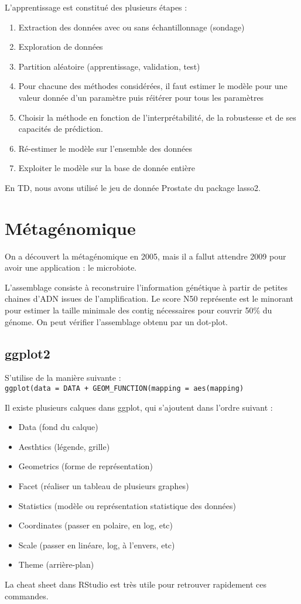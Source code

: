 \documentclass{article}
\begin{document}
L'apprentissage est constitué des plusieurs étapes :
\begin{enumerate}
\item Extraction des données avec ou sans échantillonnage (sondage)
\item Exploration de données
\item Partition aléatoire (apprentissage, validation, test)
\item Pour chacune des méthodes considérées, il faut estimer le modèle pour une valeur donnée d'un paramètre puis réitérer pour tous les paramètres
\item Choisir la méthode en fonction de l'interprétabilité, de la robustesse et de ses capacités de prédiction.
\item Ré-estimer le modèle sur l'ensemble des données
\item Exploiter le modèle sur la base de donnée entière
\end{enumerate}

En TD, nous avons utilisé le jeu de donnée Prostate du package lasso2.

\section{Métagénomique}
On a découvert la métagénomique en 2005, mais il a fallut attendre 2009 pour avoir une application : le microbiote.

L'assemblage consiste à reconstruire l'information génétique à partir de petites chaines d'ADN issues de l'amplification. Le score N50 représente est le minorant pour estimer la taille minimale des contig nécessaires pour couvrir 50\% du génome. On peut vérifier l'assemblage obtenu par un dot-plot.

\subsection{ggplot2}
S'utilise de la manière suivante :\\
\texttt{ggplot(data = DATA + GEOM\_FUNCTION(mapping = aes(mapping)}

Il existe plusieurs calques dans ggplot, qui s'ajoutent dans l'ordre suivant :
\begin{itemize}
\item Data (fond du calque)
\item Aesthtics (légende, grille)
\item Geometrics (forme de représentation)
\item Facet (réaliser un tableau de plusieurs graphes)
\item Statistics (modèle ou représentation statistique des données)
\item Coordinates (passer en polaire, en log, etc)
\item Scale (passer en linéare, log, à l'envers, etc)
\item Theme (arrière-plan)
\end{itemize}

La cheat sheet dans RStudio est très utile pour retrouver rapidement ces commandes.
\end{document}
